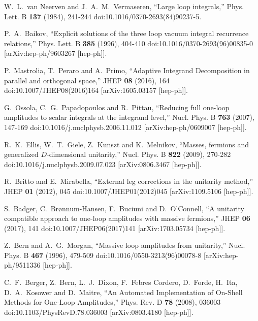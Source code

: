 W.~L.~van Neerven and J.~A.~M.~Vermaseren,
``Large loop integrals,''
Phys. Lett. B \textbf{137} (1984), 241-244
doi:10.1016/0370-2693(84)90237-5.

P.~A.~Baikov,
``Explicit solutions of the three loop vacuum integral recurrence relations,''
Phys. Lett. B \textbf{385} (1996), 404-410
doi:10.1016/0370-2693(96)00835-0
[arXiv:hep-ph/9603267 [hep-ph]].

P.~Mastrolia, T.~Peraro and A.~Primo,
``Adaptive Integrand Decomposition in parallel and orthogonal space,''
JHEP \textbf{08} (2016), 164
doi:10.1007/JHEP08(2016)164
[arXiv:1605.03157 [hep-ph]].

G.~Ossola, C.~G.~Papadopoulos and R.~Pittau,
``Reducing full one-loop amplitudes to scalar integrals at the integrand level,''
Nucl. Phys. B \textbf{763} (2007), 147-169
doi:10.1016/j.nuclphysb.2006.11.012
[arXiv:hep-ph/0609007 [hep-ph]].

R.~K.~Ellis, W.~T.~Giele, Z.~Kunszt and K.~Melnikov,
``Masses, fermions and generalized $D$-dimensional unitarity,''
Nucl. Phys. B \textbf{822} (2009), 270-282
doi:10.1016/j.nuclphysb.2009.07.023
[arXiv:0806.3467 [hep-ph]].

R.~Britto and E.~Mirabella,
``External leg corrections in the unitarity method,''
JHEP \textbf{01} (2012), 045
doi:10.1007/JHEP01(2012)045
[arXiv:1109.5106 [hep-ph]].

S.~Badger, C.~Br\o{}nnum-Hansen, F.~Buciuni and D.~O'Connell,
``A unitarity compatible approach to one-loop amplitudes with massive fermions,''
JHEP \textbf{06} (2017), 141
doi:10.1007/JHEP06(2017)141
[arXiv:1703.05734 [hep-ph]].

Z.~Bern and A.~G.~Morgan,
``Massive loop amplitudes from unitarity,''
Nucl. Phys. B \textbf{467} (1996), 479-509
doi:10.1016/0550-3213(96)00078-8
[arXiv:hep-ph/9511336 [hep-ph]].

C.~F.~Berger, Z.~Bern, L.~J.~Dixon, F.~Febres Cordero, D.~Forde, H.~Ita, D.~A.~Kosower and D.~Maitre,
``An Automated Implementation of On-Shell Methods for One-Loop Amplitudes,''
Phys. Rev. D \textbf{78} (2008), 036003
doi:10.1103/PhysRevD.78.036003
[arXiv:0803.4180 [hep-ph]].

